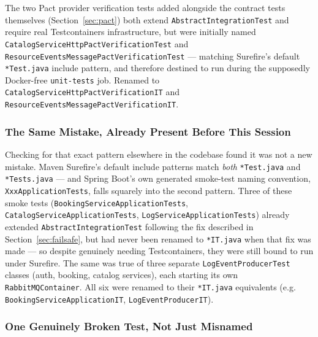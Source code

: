 The two Pact provider verification tests added alongside the contract tests themselves (Section~\ref{sec:pact}) both extend \texttt{AbstractIntegrationTest} and require real Testcontainers infrastructure, but were initially named \texttt{CatalogServiceHttpPactVerificationTest} and \texttt{ResourceEventsMessagePactVerificationTest} --- matching Surefire's default \texttt{*Test.java} include pattern, and therefore destined to run during the supposedly Docker-free \texttt{unit-tests} job. Renamed to \texttt{CatalogServiceHttpPactVerificationIT} and \texttt{ResourceEventsMessagePactVerificationIT}.

\subsubsection{The Same Mistake, Already Present Before This Session}

Checking for that exact pattern elsewhere in the codebase found it was not a new mistake. Maven Surefire's default include patterns match \emph{both} \texttt{*Test.java} and \texttt{*Tests.java} --- and Spring Boot's own generated smoke-test naming convention, \texttt{XxxApplicationTests}, falls squarely into the second pattern. Three of these smoke tests (\texttt{BookingServiceApplicationTests}, \texttt{CatalogServiceApplicationTests}, \texttt{LogServiceApplicationTests}) already extended \texttt{AbstractIntegrationTest} following the fix described in Section~\ref{sec:failsafe}, but had never been renamed to \texttt{*IT.java} when that fix was made --- so despite genuinely needing Testcontainers, they were still bound to run under Surefire. The same was true of three separate \texttt{LogEventProducerTest} classes (auth, booking, catalog services), each starting its own \texttt{RabbitMQContainer}. All six were renamed to their \texttt{*IT.java} equivalents (e.g. \texttt{BookingServiceApplicationIT}, \texttt{LogEventProducerIT}).

\subsubsection{One Genuinely Broken Test, Not Just Misnamed}

